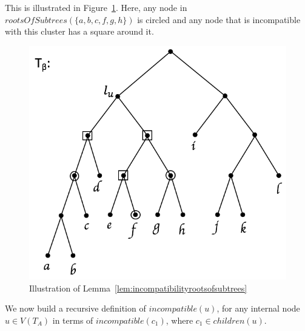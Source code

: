 \documentclass{article}
\begin{document}
    This is illustrated in Figure~\ref{fig:rootsofsubtrees}. Here, any node in $rootsOfSubtrees(\{a, b, c, f, g, h\})$ is circled and any node that is incompatible with this cluster has a square around it.

    \begin{figure}[h]
        \includegraphics[scale=0.5]{rootsofsubtrees}
        \centering
        \caption{Illustration of Lemma~\ref{lem:incompatibilityrootsofsubtrees}}
        \label{fig:rootsofsubtrees}
    \end{figure}

    We now build a recursive definition of $incompatible(u)$, for any internal node $u \in V(T_A)$ in terms of $incompatible(c_1)$, where $c_1 \in children(u)$.
    \newline
\end{document}
